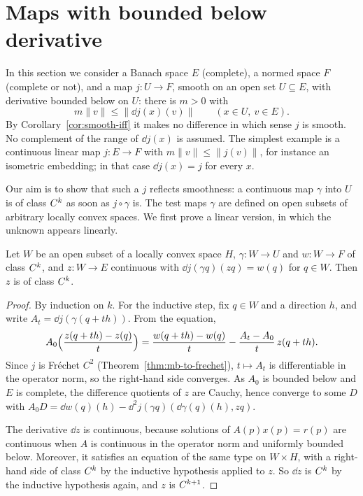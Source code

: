 \section{Maps with bounded below derivative}

In this section we consider a Banach space $E$ (complete), a normed space $F$ (complete or not),
and a map $j \colon U \to F$, smooth on an open set $U \subseteq E$, with derivative bounded
below on $U$: there is $m > 0$ with
\[
  m \|v\| \le \|\dd j(x)(v)\| \qquad (x \in U,\ v \in E).
\]
By Corollary~\ref{cor:smooth-iff} it makes no difference in which sense $j$ is smooth. No
complement of the range of $\dd j(x)$ is assumed. The simplest example is a continuous linear map
$j \colon E \to F$ with $m\|v\| \leq \|j(v)\|$, for instance an isometric embedding; in that
case $\dd j(x) = j$ for every $x$.

Our aim is to show that such a $j$ reflects smoothness: a continuous map $\gamma$ into $U$ is
of class $C^{k}$ as soon as $j \circ \gamma$ is. The test maps $\gamma$ are defined on open
subsets of arbitrary locally convex spaces. We first prove a linear version, in which the
unknown appears linearly.

\begin{lemma}
  \label{lem:bootstrap-linear}
  \leanok
  Let $W$ be an open subset of a locally convex space $H$, $\gamma \colon W \to U$ and
  $w \colon W \to F$ of class $C^{k}$, and $z \colon W \to E$ continuous with
  $\dd j(\gamma q)(z q) = w(q)$ for $q \in W$. Then $z$ is of class $C^{k}$.
\end{lemma}

\begin{proof}
  \leanok
  By induction on $k$. For the inductive step, fix $q \in W$ and a direction $h$, and write
  $A_t = \dd j(\gamma(q + th))$. From the equation,
  \[
    A_0\Bigl(\frac{z(q + th) - z(q)}{t}\Bigr)
      = \frac{w(q + th) - w(q)}{t} - \frac{A_t - A_0}{t}\, z(q + th).
  \]
  Since $j$ is Fréchet $C^2$ (Theorem~\ref{thm:mb-to-frechet}), $t \mapsto A_t$ is
  differentiable in the operator norm, so the right-hand side converges. As $A_0$ is bounded
  below and $E$ is complete, the difference quotients of $z$ are Cauchy, hence converge to some
  $D$ with $A_0 D = \dd w(q)(h) - \dd^2 j(\gamma q)(\dd\gamma(q)(h), z q)$.

  The derivative $\dd z$ is continuous, because solutions of $A(p) x(p) = r(p)$ are continuous
  when $A$ is continuous in the operator norm and uniformly bounded below. Moreover, it
  satisfies an equation of the same type on $W \times H$, with a right-hand side of class
  $C^{k}$ by the inductive hypothesis applied to $z$. So $\dd z$ is $C^{k}$ by the inductive
  hypothesis again, and $z$ is $C^{k+1}$.
\end{proof}

